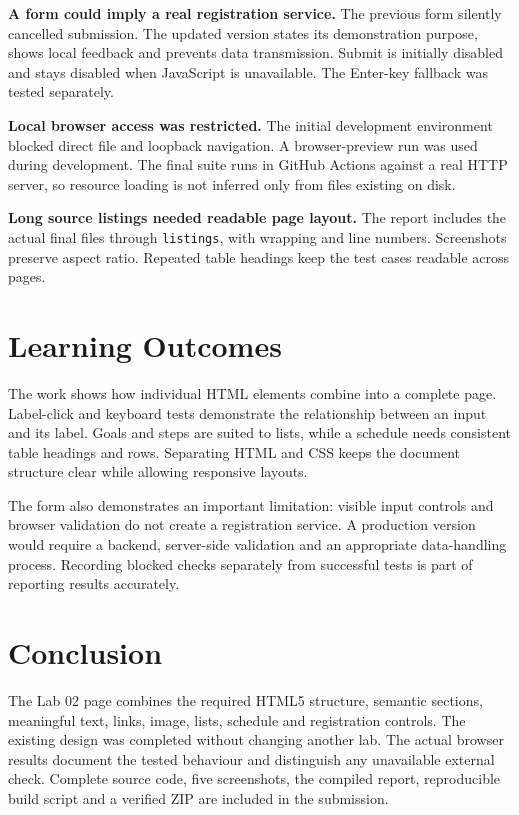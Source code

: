\documentclass[11pt,a4paper]{article}
\begin{document}
\textbf{A form could imply a real registration service.} The previous form silently cancelled submission. The updated version states its demonstration purpose, shows local feedback and prevents data transmission. Submit is initially disabled and stays disabled when JavaScript is unavailable. The Enter-key fallback was tested separately.

\textbf{Local browser access was restricted.} The initial development environment blocked direct file and loopback navigation. A browser-preview run was used during development. The final suite runs in GitHub Actions against a real HTTP server, so resource loading is not inferred only from files existing on disk.

\textbf{Long source listings needed readable page layout.} The report includes the actual final files through \texttt{listings}, with wrapping and line numbers. Screenshots preserve aspect ratio. Repeated table headings keep the test cases readable across pages.
\section{Learning Outcomes}
The work shows how individual HTML elements combine into a complete page. Label-click and keyboard tests demonstrate the relationship between an input and its label. Goals and steps are suited to lists, while a schedule needs consistent table headings and rows. Separating HTML and CSS keeps the document structure clear while allowing responsive layouts.

The form also demonstrates an important limitation: visible input controls and browser validation do not create a registration service. A production version would require a backend, server-side validation and an appropriate data-handling process. Recording blocked checks separately from successful tests is part of reporting results accurately.
\clearpage
\section{Conclusion}
The Lab 02 page combines the required HTML5 structure, semantic sections, meaningful text, links, image, lists, schedule and registration controls. The existing design was completed without changing another lab. The actual browser results document the tested behaviour and distinguish any unavailable external check. Complete source code, five screenshots, the compiled report, reproducible build script and a verified ZIP are included in the submission.
\end{document}
